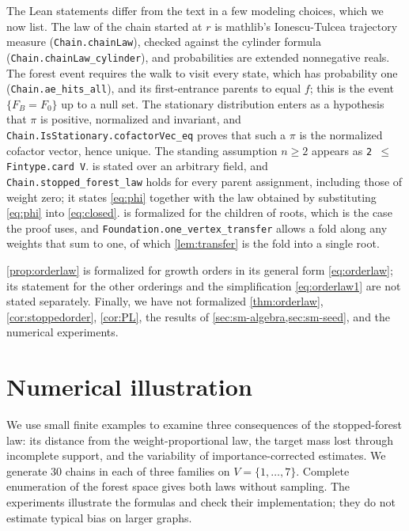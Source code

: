 \documentclass[onefignum,onetabnum]{siamart250211}
\numberwithin{theorem}{section}
\numberwithin{equation}{section}
\begin{document}
\begin{sloppypar}
The Lean statements differ from the text in a few
modeling choices, which we now list. The law of the chain started at $r$ is mathlib's Ionescu-Tulcea
trajectory measure (\texttt{Chain.chainLaw}), checked against the
cylinder formula (\texttt{Chain.chainLaw\_cylinder}), and probabilities
are extended nonnegative reals. The forest event requires the walk to
visit every state, which has probability one
(\texttt{Chain.ae\_hits\_all}), and its first-entrance parents to equal
$f$; this is the event $\{F_B=F_0\}$ up to a null set. The stationary
distribution enters as a hypothesis that $\pi$ is positive, normalized
and invariant, and \texttt{Chain.IsStationary.cofactorVec\_eq} proves
that such a $\pi$ is the normalized cofactor vector, hence unique. The
standing assumption $n\ge2$ appears as \texttt{2 \(\le\) Fintype.card V}.
 is stated over an arbitrary field, and
\texttt{Chain.stopped\_forest\_law} holds for every parent assignment,
including those of weight zero; it states \eqref{eq:phi} together with
the law obtained by substituting \eqref{eq:phi} into
\eqref{eq:closed}.  is formalized for
the children of roots, which is the case the proof uses, and
\texttt{Foundation.one\_vertex\_transfer} allows a fold along any
weights that sum to one, of which \cref{lem:transfer} is the fold into
a single root.
\end{sloppypar}

\cref{prop:orderlaw} is formalized for
growth orders in its general form \eqref{eq:orderlaw}; its statement for
the other orderings and the simplification \eqref{eq:orderlaw1} are not
stated separately. Finally, we have not formalized \cref{thm:orderlaw}, \cref{cor:stoppedorder},
\cref{cor:PL}, the results of
\cref{sec:sm-algebra,sec:sm-seed}, and the numerical
experiments.

\section{Numerical illustration}\label{sec:numerics}

We use small finite examples to examine three consequences of the
stopped-forest law: its distance from the weight-proportional law,
the target mass lost through incomplete support, and the variability
of importance-corrected estimates. We generate $30$ chains in each
of three families on $V=\{1,\dots,7\}$. Complete enumeration of the
forest space gives both laws without sampling. The experiments
illustrate the formulas and check their implementation; they do not
estimate typical bias on larger graphs.
\end{document}
